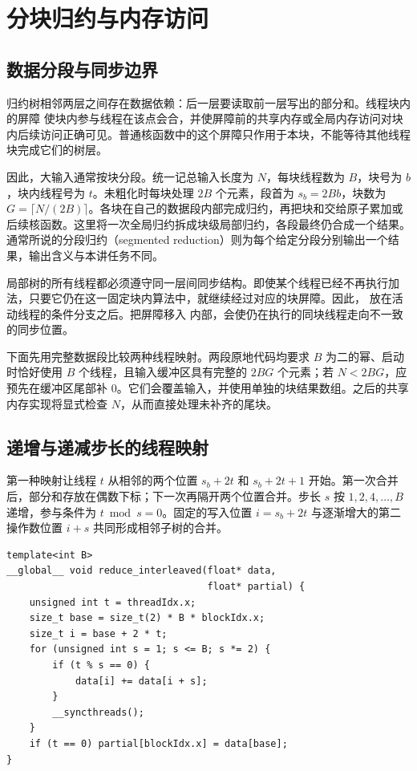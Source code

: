 \section{分块归约与内存访问}
\label{l15:sec:memory}

\subsection{数据分段与同步边界}

归约树相邻两层之间存在数据依赖：后一层要读取前一层写出的部分和。线程块内的屏障 \mbox{} 使块内参与线程在该点会合，并使屏障前的共享内存或全局内存访问对块内后续访问正确可见。普通核函数中的这个屏障只作用于本块，不能等待其他线程块完成它们的树层。

因此，大输入通常按块分段。统一记总输入长度为 $N$，每块线程数为 $B$，块号为 $b$，块内线程号为 $t$。未粗化时每块处理 $2B$ 个元素，段首为 $s_b=2Bb$，块数为 $G=\lceil N/(2B)\rceil$。各块在自己的数据段内部完成归约，再把块和交给原子累加或后续核函数。这里将一次全局归约拆成块级局部归约，各段最终仍合成一个结果。通常所说的分段归约（segmented reduction）则为每个给定分段分别输出一个结果，输出含义与本讲任务不同。

局部树的所有线程都必须遵守同一层间同步结构。即使某个线程已经不再执行加法，只要它仍在这一固定块内算法中，就继续经过对应的块屏障。因此，\mbox{} 放在活动线程的条件分支之后。把屏障移入 \mbox{} 内部，会使仍在执行的同块线程走向不一致的同步位置。

下面先用完整数据段比较两种线程映射。两段原地代码均要求 $B$ 为二的幂、启动时恰好使用 $B$ 个线程，且输入缓冲区具有完整的 $2BG$ 个元素；若 $N<2BG$，应预先在缓冲区尾部补 $0$。它们会覆盖输入，并使用单独的块结果数组。之后的共享内存实现将显式检查 $N$，从而直接处理未补齐的尾块。

\subsection{递增与递减步长的线程映射}

第一种映射让线程 $t$ 从相邻的两个位置 $s_b+2t$ 和 $s_b+2t+1$ 开始。第一次合并后，部分和存放在偶数下标；下一次再隔开两个位置合并。步长 $s$ 按 $1,2,4,\ldots,B$ 递增，参与条件为 $t\bmod s=0$。固定的写入位置 $i=s_b+2t$ 与逐渐增大的第二操作数位置 $i+s$ 共同形成相邻子树的合并。

\noindent\begin{minipage}{\linewidth}
\begin{lstlisting}[caption={递增步长：在全局输入数组中原地合并},label={l15:lst:code1}]
template<int B>
__global__ void reduce_interleaved(float* data,
                                   float* partial) {
    unsigned int t = threadIdx.x;
    size_t base = size_t(2) * B * blockIdx.x;
    size_t i = base + 2 * t;
    for (unsigned int s = 1; s <= B; s *= 2) {
        if (t % s == 0) {
            data[i] += data[i + s];
        }
        __syncthreads();
    }
    if (t == 0) partial[blockIdx.x] = data[base];
}
\end{lstlisting}
\end{minipage}

